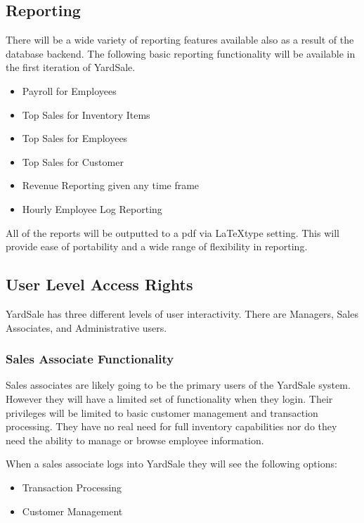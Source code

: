 \documentclass{report}
\begin{document}
\subsection{Reporting}

There will be a wide variety of reporting features available also as a result of the database backend. The following basic reporting functionality will be available in the first iteration of YardSale.

\begin{itemize}
\item{Payroll for Employees}
\item{Top Sales for Inventory Items}
\item{Top Sales for Employees}
\item{Top Sales for Customer}
\item{Revenue Reporting given any time frame}
\item{Hourly Employee Log Reporting}
\end{itemize}

All of the reports will be outputted to a pdf via \LaTeX type setting. This will provide ease of portability and a wide range of flexibility in reporting.


\subsection{User Level Access Rights}

YardSale has three different levels of user interactivity. There are Managers, Sales Associates, and Administrative users.

\subsubsection{Sales Associate Functionality}

Sales associates are likely going to be the primary users of the YardSale system. However they will have a limited set of functionality when they login. Their privileges will be limited to basic customer management and transaction processing. They have no real need for full inventory capabilities nor do they need the ability to manage or browse employee information.

When a sales associate logs into YardSale they will see the following options:

\begin{itemize}
\item Transaction Processing
\item Customer Management
\end{itemize}
\end{document}
